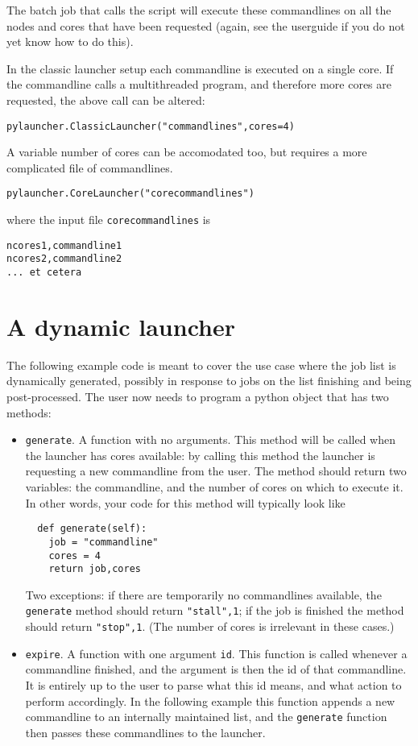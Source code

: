 \documentclass[11pt]{artikel3}
\newcommand\n[1]{{\tt #1}}
\begin{document}
The batch job that calls the script will execute these commandlines on
all the nodes and cores that have been requested (again, see the
userguide if you do not yet know how to do this).

In the classic launcher setup each commandline is executed on a single
core. If the commandline calls a multithreaded program, and therefore
more cores are requested, the above call can be altered:
\begin{verbatim}
pylauncher.ClassicLauncher("commandlines",cores=4)
\end{verbatim}

A variable number of cores can be accomodated too, but requires a more
complicated file of commandlines. 
\begin{verbatim}
pylauncher.CoreLauncher("corecommandlines")
\end{verbatim}
where the input file \n{corecommandlines} is
\begin{verbatim}
ncores1,commandline1
ncores2,commandline2
... et cetera
\end{verbatim}

\section*{A dynamic launcher}

The following example code is meant to cover the use case where the
job list is dynamically generated, possibly in response to jobs on the
list finishing and being post-processed. The user now needs to program
a python object that has two methods:
\begin{itemize}
\item \n{generate}. A function with no arguments. This method will be
  called when the launcher has cores available: by calling this method
  the launcher is requesting a new commandline from the user. The
  method should return two variables: the commandline, and the number
  of cores on which to execute it. In other words, your code for this
  method will typically look like
\begin{verbatim}
  def generate(self):
    job = "commandline"
    cores = 4
    return job,cores
\end{verbatim}
  Two exceptions: if there are temporarily no commandlines available,
  the \n{generate} method should return \n{"stall",1}; if the job is
  finished the method should return \n{"stop",1}. (The number of cores
  is irrelevant in these cases.)
\item \n{expire}. A function with one argument \n{id}. This function
  is called whenever a commandline finished, and the argument is then
  the id of that commandline. It is entirely up to the user to parse
  what this id means, and what action to perform
  accordingly. In the following example this function appends a new
  commandline to an internally maintained list, and the \n{generate}
  function then passes these commandlines to the launcher.
\end{itemize}
\end{document}
